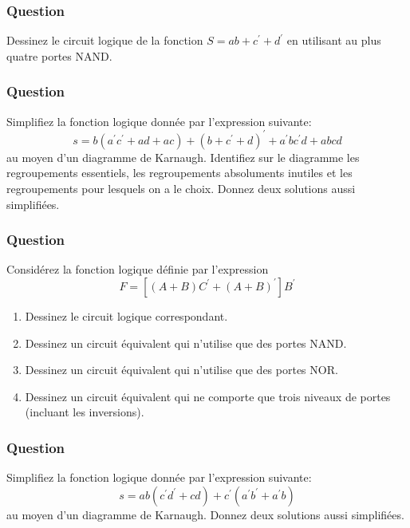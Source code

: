\documentclass[11pt]{article}
\begin{document}
\subsubsection*{Question}
\label{sec:org87e1976}
Dessinez le circuit logique de la fonction \(S = a b + c^\prime +
    d^\prime\) en utilisant au plus quatre portes NAND.

\subsubsection*{Question}
\label{sec:org6ee54c6}
Simplifiez la fonction logique donnée par l'expression suivante:
  $$
    s = b (a^{\prime} c^{\prime} + a d + a c) + (b + c^{\prime}+
      d)^{\prime} + a^{\prime} b c^{\prime} d + a b c d
    $$ 
  au moyen d'un
  diagramme de Karnaugh. Identifiez sur le diagramme les regroupements
  essentiels, les regroupements absoluments inutiles et les
  regroupements pour lesquels on a le choix. Donnez deux solutions
  aussi simplifiées.

\subsubsection*{Question}
\label{sec:orgf5a21e1}
Considérez la fonction logique définie par l'expression 
  $$
    F = [ (A + B) C^{\prime} + (A+B)^{\prime} ] B^{\prime}
    $$

\begin{enumerate}
\item Dessinez le circuit logique correspondant.

\item Dessinez un circuit équivalent qui n'utilise que des portes
NAND.

\item Dessinez un circuit équivalent qui n'utilise que des portes
NOR.

\item Dessinez un circuit équivalent qui ne comporte que trois niveaux de
portes (incluant les inversions).
\end{enumerate}

\subsubsection*{Question}
\label{sec:orge63a39c}
Simplifiez la fonction logique donnée par l'expression suivante:
  $$
    s = a b ( c^{\prime} d^{\prime} + c d) + c^{\prime}(a^{\prime}
      b^{\prime} + a^{\prime} b)
    $$
   au moyen d'un diagramme de Karnaugh. Donnez deux solutions aussi simplifiées.
\end{document}
